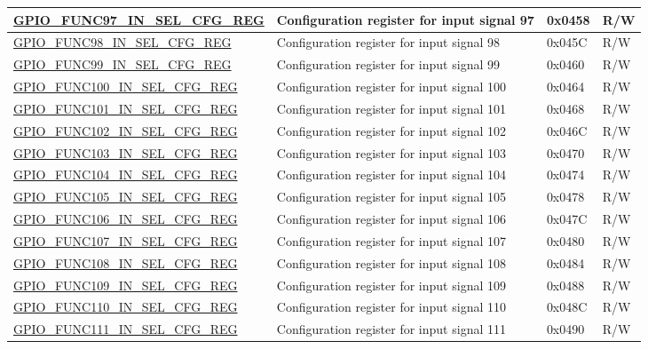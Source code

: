 \begin{longtable}{ | p{5.5cm} | p{7cm} | p{1.3cm} | p{1.9cm} | }
\hyperref[regdesc:GPIOFUNCUINSELCFGREG]{GPIO\_FUNC97\_IN\_SEL\_CFG\_REG} & Configuration register for input signal 97 & 0x0458 & R/W \\ \hline
\hyperref[regdesc:GPIOFUNCUINSELCFGREG]{GPIO\_FUNC98\_IN\_SEL\_CFG\_REG} & Configuration register for input signal 98 & 0x045C & R/W \\ \hline
\hyperref[regdesc:GPIOFUNCUINSELCFGREG]{GPIO\_FUNC99\_IN\_SEL\_CFG\_REG} & Configuration register for input signal 99 & 0x0460 & R/W \\ \hline
\hyperref[regdesc:GPIOFUNCUINSELCFGREG]{GPIO\_FUNC100\_IN\_SEL\_CFG\_REG} & Configuration register for input signal 100 & 0x0464 & R/W \\ \hline
\hyperref[regdesc:GPIOFUNCUINSELCFGREG]{GPIO\_FUNC101\_IN\_SEL\_CFG\_REG} & Configuration register for input signal 101 & 0x0468 & R/W \\ \hline
\hyperref[regdesc:GPIOFUNCUINSELCFGREG]{GPIO\_FUNC102\_IN\_SEL\_CFG\_REG} & Configuration register for input signal 102 & 0x046C & R/W \\ \hline
\hyperref[regdesc:GPIOFUNCUINSELCFGREG]{GPIO\_FUNC103\_IN\_SEL\_CFG\_REG} & Configuration register for input signal 103 & 0x0470 & R/W \\ \hline
\hyperref[regdesc:GPIOFUNCUINSELCFGREG]{GPIO\_FUNC104\_IN\_SEL\_CFG\_REG} & Configuration register for input signal 104 & 0x0474 & R/W \\ \hline
\hyperref[regdesc:GPIOFUNCUINSELCFGREG]{GPIO\_FUNC105\_IN\_SEL\_CFG\_REG} & Configuration register for input signal 105 & 0x0478 & R/W \\ \hline
\hyperref[regdesc:GPIOFUNCUINSELCFGREG]{GPIO\_FUNC106\_IN\_SEL\_CFG\_REG} & Configuration register for input signal 106 & 0x047C & R/W \\ \hline
\hyperref[regdesc:GPIOFUNCUINSELCFGREG]{GPIO\_FUNC107\_IN\_SEL\_CFG\_REG} & Configuration register for input signal 107 & 0x0480 & R/W \\ \hline
\hyperref[regdesc:GPIOFUNCUINSELCFGREG]{GPIO\_FUNC108\_IN\_SEL\_CFG\_REG} & Configuration register for input signal 108 & 0x0484 & R/W \\ \hline
\hyperref[regdesc:GPIOFUNCUINSELCFGREG]{GPIO\_FUNC109\_IN\_SEL\_CFG\_REG} & Configuration register for input signal 109 & 0x0488 & R/W \\ \hline
\hyperref[regdesc:GPIOFUNCUINSELCFGREG]{GPIO\_FUNC110\_IN\_SEL\_CFG\_REG} & Configuration register for input signal 110 & 0x048C & R/W \\ \hline
\hyperref[regdesc:GPIOFUNCUINSELCFGREG]{GPIO\_FUNC111\_IN\_SEL\_CFG\_REG} & Configuration register for input signal 111 & 0x0490 & R/W \\ \hline

\end{longtable}
